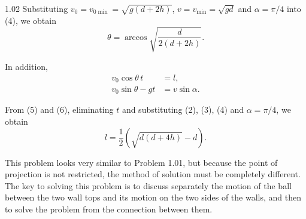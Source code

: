 \begin{solution}{1.02}
Substituting $v_0=v_{0\min}=\sqrt{g(d+2h)}$, $v=v_{\min}=\sqrt{gd}$ and $\alpha=\pi/4$ into (4),
we obtain
\begin{equation*}
\theta = \arccos\sqrt{\frac{d}{2(d+2h)}}.
\end{equation*}

In addition,
\begin{align}
v_0\cos\theta\, t &= l, \tag{5}\\
v_0\sin\theta - gt &= v\sin\alpha. \tag{6}
\end{align}

From (5) and (6), eliminating $t$ and substituting (2), (3), (4) and $\alpha=\pi/4$, we obtain
\begin{equation*}
l = \frac{1}{2}\left(\sqrt{d(d+4h)}-d\right).
\end{equation*}

\begin{commentary}
This problem looks very similar to Problem 1.01, but because the point of projection is not
restricted, the method of solution must be completely different. The key to solving this problem
is to discuss separately the motion of the ball between the two wall tops and its motion on the
two sides of the walls, and then to solve the problem from the connection between them.
\end{commentary}
\end{solution}

